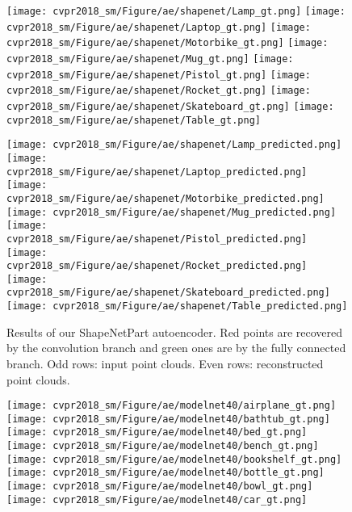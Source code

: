 \documentclass[10pt,twocolumn,letterpaper]{article}
\begin{document}
\begin{figure*}[t]
        \texttt{[image: cvpr2018\_sm/Figure/ae/shapenet/Lamp\_gt.png]}
        \texttt{[image: cvpr2018\_sm/Figure/ae/shapenet/Laptop\_gt.png]}
        \texttt{[image: cvpr2018\_sm/Figure/ae/shapenet/Motorbike\_gt.png]}
        \texttt{[image: cvpr2018\_sm/Figure/ae/shapenet/Mug\_gt.png]}
        \texttt{[image: cvpr2018\_sm/Figure/ae/shapenet/Pistol\_gt.png]}
        \texttt{[image: cvpr2018\_sm/Figure/ae/shapenet/Rocket\_gt.png]}
        \texttt{[image: cvpr2018\_sm/Figure/ae/shapenet/Skateboard\_gt.png]}
        \texttt{[image: cvpr2018\_sm/Figure/ae/shapenet/Table\_gt.png]}
        
        \texttt{[image: cvpr2018\_sm/Figure/ae/shapenet/Lamp\_predicted.png]}
        \texttt{[image: cvpr2018\_sm/Figure/ae/shapenet/Laptop\_predicted.png]}
        \texttt{[image: cvpr2018\_sm/Figure/ae/shapenet/Motorbike\_predicted.png]}
        \texttt{[image: cvpr2018\_sm/Figure/ae/shapenet/Mug\_predicted.png]}
        \texttt{[image: cvpr2018\_sm/Figure/ae/shapenet/Pistol\_predicted.png]}
        \texttt{[image: cvpr2018\_sm/Figure/ae/shapenet/Rocket\_predicted.png]}
        \texttt{[image: cvpr2018\_sm/Figure/ae/shapenet/Skateboard\_predicted.png]}
        \texttt{[image: cvpr2018\_sm/Figure/ae/shapenet/Table\_predicted.png]}
        
        \caption{Results of our ShapeNetPart autoencoder. Red points are recovered by the convolution branch and green ones are by the fully connected branch. Odd rows: input point clouds. Even rows: reconstructed point clouds.}
        \label{fig_ae_shapenet}
        \vspace{-4pt}
\end{figure*}\begin{figure*}[t] 
        \centering
        
        \texttt{[image: cvpr2018\_sm/Figure/ae/modelnet40/airplane\_gt.png]}
        \texttt{[image: cvpr2018\_sm/Figure/ae/modelnet40/bathtub\_gt.png]}
        \texttt{[image: cvpr2018\_sm/Figure/ae/modelnet40/bed\_gt.png]}
        \texttt{[image: cvpr2018\_sm/Figure/ae/modelnet40/bench\_gt.png]}
        \texttt{[image: cvpr2018\_sm/Figure/ae/modelnet40/bookshelf\_gt.png]}
        \texttt{[image: cvpr2018\_sm/Figure/ae/modelnet40/bottle\_gt.png]}
        \texttt{[image: cvpr2018\_sm/Figure/ae/modelnet40/bowl\_gt.png]}
        \texttt{[image: cvpr2018\_sm/Figure/ae/modelnet40/car\_gt.png]}
        

\end{figure*}
\end{document}
